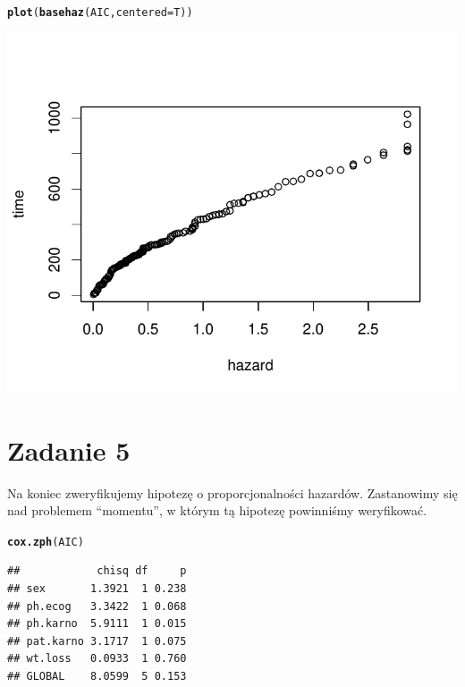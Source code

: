 \documentclass[12pt, a4paper]{article}\usepackage[]{graphicx}\usepackage[]{color}
\makeatletter
\def\maxwidth{ %
  \ifdim\Gin@nat@width>\linewidth
    \linewidth
  \else
    \Gin@nat@width
  \fi
}
\newcommand{\hlstd}[1]{\textcolor[rgb]{0.345,0.345,0.345}{#1}}%
\newcommand{\hlkwc}[1]{\textcolor[rgb]{0.333,0.667,0.333}{#1}}%
\newcommand{\hlkwd}[1]{\textcolor[rgb]{0.737,0.353,0.396}{\textbf{#1}}}%
\newenvironment{kframe}{%
 \def\at@end@of@kframe{}%
 \ifinner\ifhmode%
  \def\at@end@of@kframe{\end{minipage}}%
  \begin{minipage}{\columnwidth}%
 \fi\fi%
 \def\FrameCommand##1{\hskip\@totalleftmargin \hskip-\fboxsep
 \colorbox{shadecolor}{##1}\hskip-\fboxsep
     \hskip-\linewidth \hskip-\@totalleftmargin \hskip\columnwidth}%
 \MakeFramed {\advance\hsize-\width
   \@totalleftmargin\z@ \linewidth\hsize
   \@setminipage}}%
 {\par\unskip\endMakeFramed%
 \at@end@of@kframe}
\newenvironment{knitrout}{}{} %
\makeatother
\begin{document}
\begin{knitrout}
\color{fgcolor}\begin{kframe}
\begin{alltt}
\hlkwd{plot}\hlstd{(}\hlkwd{basehaz}\hlstd{(AIC,} \hlkwc{centered} \hlstd{= T))}
\end{alltt}
\end{kframe}

{\centering \includegraphics[width=\maxwidth]{figure/unnamed-chunk-6-1} 

}


\end{knitrout}

\section{Zadanie 5}

Na koniec zweryfikujemy hipotezę o proporcjonalności hazardów. Zastanowimy się nad problemem “momentu”,
w którym tą hipotezę powinniśmy weryfikować.
\begin{knitrout}
\color{fgcolor}\begin{kframe}
\begin{alltt}
\hlkwd{cox.zph}\hlstd{(AIC)}
\end{alltt}
\begin{verbatim}
##            chisq df     p
## sex       1.3921  1 0.238
## ph.ecog   3.3422  1 0.068
## ph.karno  5.9111  1 0.015
## pat.karno 3.1717  1 0.075
## wt.loss   0.0933  1 0.760
## GLOBAL    8.0599  5 0.153
\end{verbatim}
\end{kframe}
\end{knitrout}
\end{document}
